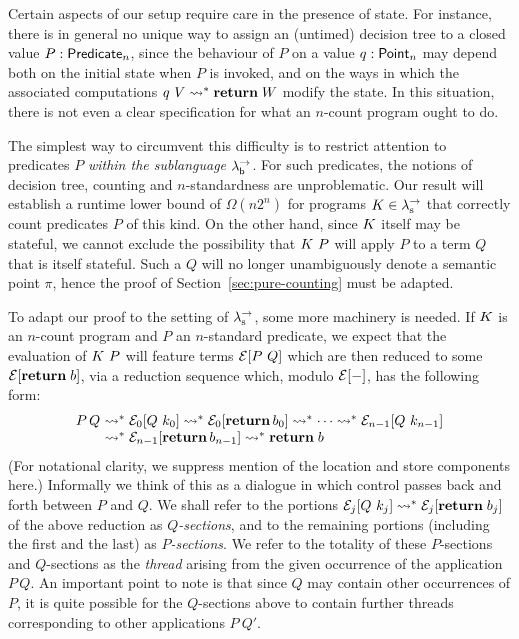 \documentclass[12pt,phd,lfcs,twoside,openright,logo,leftchapter,normalheadings]{infthesis}
\theoremstyle{plain}
\theoremstyle{definition}
\begin{document}
Certain aspects of our setup require care in the presence of state.
For instance, there is in general no unique way to assign an (untimed)
decision tree to a closed value $P : \mathsf{Predicate}_n$, since the
behaviour of $P$ on a value $q : \mathsf{Point}_n$ may depend both on the
initial state when $P$ is invoked, and on the ways in which the
associated computations $q~V \leadsto^\ast \mathbf{return}\;W$ modify the
state.  In this situation, there is not even a clear specification for
what an $n$-count program ought to do.

The simplest way to circumvent this difficulty is to restrict
attention to predicates $P$ \emph{within the sublanguage $\lambda^\rightarrow_{\mathsf{b}}$}.
For such predicates, the notions of decision tree, counting and
$n$-standardness are unproblematic. Our result will establish a
runtime lower bound of $\Omega(n2^n)$ for programs $K \in
\lambda^\rightarrow_{\textrm{\normalfont s}}$ that correctly count predicates $P$ of this kind.
%
On the other hand, since $K$ itself may be stateful, we
cannot exclude the possibility that $K~P$ will apply $P$ to a
term $Q$ that is itself stateful. Such a $Q$ will no longer
unambiguously denote a semantic point $\pi$, hence the proof of
Section~\ref{sec:pure-counting} must be adapted.

To adapt our proof to the setting of $\lambda^\rightarrow_{\textrm{\normalfont s}}$, some more machinery is
needed.  If $K$ is an $n$-count program and $P$ an
$n$-standard predicate, we expect that the evaluation of
$K~P$ will feature terms $\mathcal{E}[P~Q]$ which are then reduced to
some $\mathcal{E}[\mathbf{return}\;b]$, via a reduction sequence which, modulo
$\mathcal{E}[-]$, has the following form:
%
{
\[
  P\,Q~
    \bl \reducesto^\ast \EC_0[Q~k_0] \reducesto^\ast \EC_0[\Return\,b_0] \reducesto^\ast \cdots
        \reducesto^\ast \EC_{n-1}[Q~k_{n-1}]\\
        \reducesto^\ast \EC_{n-1}[\Return\,b_{n-1}]
        \reducesto^\ast \Return\;b
    \el
\]}%
%
(For notational clarity, we suppress mention of the location and store
components here.)  Informally we think of this as a dialogue in
which control passes back and forth between $P$ and $Q$. We shall
refer to the portions $\mathcal{E}_j[Q~k_j] \leadsto^\ast
\mathcal{E}_j[\mathbf{return}\;b_j]$ of the above reduction as \emph{$Q$-sections},
and to the remaining portions (including the first and the last) as
\emph{$P$-sections}. We refer to the totality of these $P$-sections
and $Q$-sections as the \emph{thread} arising from the given
occurrence of the application $P\,Q$.  An important point to note is
that since $Q$ may contain other occurrences of $P$, it is quite
possible for the $Q$-sections above to contain further threads
corresponding to other applications $P~Q'$.
\end{document}
